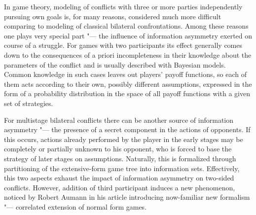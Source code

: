 
{\actuality} In game theory, modeling of conflicts with three or more parties independently pursuing own goals is, for many reasons, considered much more difficult comparing to modeling of classical bilateral confrontations. Among these reasons one plays very special part "--- the influence of information asymmetry exerted on course of a struggle. For games with two participants its effect generally comes down to the consequences of a priori incompleteness in their knowledge about the parameters of the conflict and is usually described with Bayesian models. Common knowledge in such cases leaves out players' payoff functions, so each of them acts according to their own, possibly different assumptions, expressed in the form of a probability distribution in the space of all payoff functions with a given set of strategies. %

For multistage bilateral conflicts there can be another source of information asymmetry "--- the presence of a secret component in the actions of opponents. If this occurs, actions already performed by the player in the early stages may be completely or partially unknown to his opponent, who is forced to base the strategy of later stages on assumptions. Naturally, this is formalized through partitioning of the extensive-form game tree into information sets. Effectively, this two aspects exhaust the impact of information asymmetry on two-sided conflicts. However, addition of third participant induces a new phenomenon, noticed by Robert Aumann in his article \cite{Aumann74} introducing now-familiar new formalism "--- correlated extension of normal form games. %

